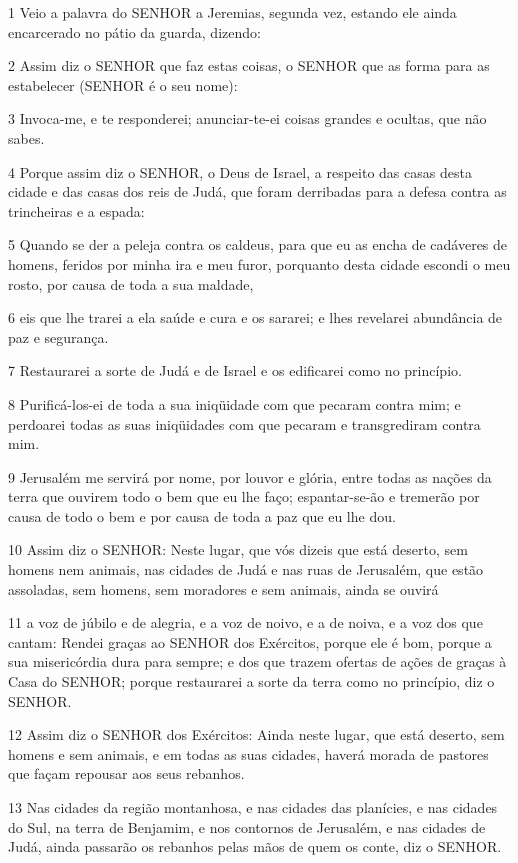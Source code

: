 \par 1 Veio a palavra do SENHOR a Jeremias, segunda vez, estando ele ainda encarcerado no pátio da guarda, dizendo:
\par 2 Assim diz o SENHOR que faz estas coisas, o SENHOR que as forma para as estabelecer (SENHOR é o seu nome):
\par 3 Invoca-me, e te responderei; anunciar-te-ei coisas grandes e ocultas, que não sabes.
\par 4 Porque assim diz o SENHOR, o Deus de Israel, a respeito das casas desta cidade e das casas dos reis de Judá, que foram derribadas para a defesa contra as trincheiras e a espada:
\par 5 Quando se der a peleja contra os caldeus, para que eu as encha de cadáveres de homens, feridos por minha ira e meu furor, porquanto desta cidade escondi o meu rosto, por causa de toda a sua maldade,
\par 6 eis que lhe trarei a ela saúde e cura e os sararei; e lhes revelarei abundância de paz e segurança.
\par 7 Restaurarei a sorte de Judá e de Israel e os edificarei como no princípio.
\par 8 Purificá-los-ei de toda a sua iniqüidade com que pecaram contra mim; e perdoarei todas as suas iniqüidades com que pecaram e transgrediram contra mim.
\par 9 Jerusalém me servirá por nome, por louvor e glória, entre todas as nações da terra que ouvirem todo o bem que eu lhe faço; espantar-se-ão e tremerão por causa de todo o bem e por causa de toda a paz que eu lhe dou.
\par 10 Assim diz o SENHOR: Neste lugar, que vós dizeis que está deserto, sem homens nem animais, nas cidades de Judá e nas ruas de Jerusalém, que estão assoladas, sem homens, sem moradores e sem animais, ainda se ouvirá
\par 11 a voz de júbilo e de alegria, e a voz de noivo, e a de noiva, e a voz dos que cantam: Rendei graças ao SENHOR dos Exércitos, porque ele é bom, porque a sua misericórdia dura para sempre; e dos que trazem ofertas de ações de graças à Casa do SENHOR; porque restaurarei a sorte da terra como no princípio, diz o SENHOR.
\par 12 Assim diz o SENHOR dos Exércitos: Ainda neste lugar, que está deserto, sem homens e sem animais, e em todas as suas cidades, haverá morada de pastores que façam repousar aos seus rebanhos.
\par 13 Nas cidades da região montanhosa, e nas cidades das planícies, e nas cidades do Sul, na terra de Benjamim, e nos contornos de Jerusalém, e nas cidades de Judá, ainda passarão os rebanhos pelas mãos de quem os conte, diz o SENHOR.
